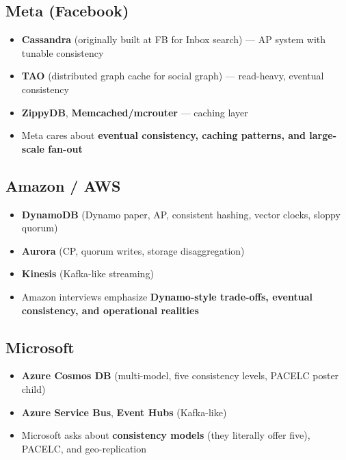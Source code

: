 \documentclass[11pt]{article}
\providecommand{\tightlist}{\setlength{\itemsep}{1pt}\setlength{\parskip}{0pt}}
\begin{document}
\subsection{Meta (Facebook)}\label{meta-facebook}

\begin{itemize}
\tightlist
\item
  \textbf{Cassandra} (originally built at FB for Inbox search) --- AP system with tunable consistency
\item
  \textbf{TAO} (distributed graph cache for social graph) --- read-heavy, eventual consistency
\item
  \textbf{ZippyDB}, \textbf{Memcached/mcrouter} --- caching layer
\item
  Meta cares about \textbf{eventual consistency, caching patterns, and large-scale fan-out}
\end{itemize}

\subsection{Amazon / AWS}\label{amazon--aws}

\begin{itemize}
\tightlist
\item
  \textbf{DynamoDB} (Dynamo paper, AP, consistent hashing, vector clocks, sloppy quorum)
\item
  \textbf{Aurora} (CP, quorum writes, storage disaggregation)
\item
  \textbf{Kinesis} (Kafka-like streaming)
\item
  Amazon interviews emphasize \textbf{Dynamo-style trade-offs, eventual consistency, and operational realities}
\end{itemize}

\subsection{Microsoft}\label{microsoft}

\begin{itemize}
\tightlist
\item
  \textbf{Azure Cosmos DB} (multi-model, five consistency levels, PACELC poster child)
\item
  \textbf{Azure Service Bus}, \textbf{Event Hubs} (Kafka-like)
\item
  Microsoft asks about \textbf{consistency models} (they literally offer five), PACELC, and geo-replication
\end{itemize}
\end{document}
